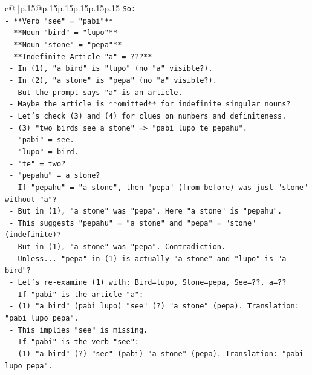 \documentclass{article}
\begin{document}
{\begin{supertabular}{c@{$\;$}|p{.15\linewidth}@{}p{.15\linewidth}p{.15\linewidth}p{.15\linewidth}p{.15\linewidth}p{.15\linewidth}}
{{{\texttt{So:} \\
\texttt{{-} **Verb "see" = "pabi"**} \\
\texttt{{-} **Noun "bird" = "lupo"**} \\
\texttt{{-} **Noun "stone" = "pepa"**} \\
\texttt{{-} **Indefinite Article "a" = ???**} \\
\texttt{  {-} In (1), "a bird" is "lupo" (no "a" visible?).} \\
\texttt{  {-} In (2), "a stone" is "pepa" (no "a" visible?).} \\
\texttt{  {-} But the prompt says "a" is an article.} \\
\texttt{  {-} Maybe the article is **omitted** for indefinite singular nouns?} \\
\texttt{  {-} Let's check (3) and (4) for clues on numbers and definiteness.} \\
\texttt{  {-} (3) "two birds see a stone" => "pabi lupo te pepahu".} \\
\texttt{    {-} "pabi" = see.} \\
\texttt{    {-} "lupo" = bird.} \\
\texttt{    {-} "te" = two?} \\
\texttt{    {-} "pepahu" = a stone?} \\
\texttt{    {-} If "pepahu" = "a stone", then "pepa" (from before) was just "stone" without "a"?} \\
\texttt{    {-} But in (1), "a stone" was "pepa". Here "a stone" is "pepahu".} \\
\texttt{    {-} This suggests "pepahu" = "a stone" and "pepa" = "stone" (indefinite)?} \\
\texttt{    {-} But in (1), "a stone" was "pepa". Contradiction.} \\
\texttt{    {-} Unless... "pepa" in (1) is actually "a stone" and "lupo" is "a bird"?} \\
\texttt{    {-} Let's re{-}examine (1) with: Bird=lupo, Stone=pepa, See=??, a=??} \\
\texttt{    {-} If "pabi" is the article "a":} \\
\texttt{      {-} (1) "a bird" (pabi lupo) "see" (?) "a stone" (pepa). Translation: "pabi lupo pepa".} \\
\texttt{      {-} This implies "see" is missing.} \\
\texttt{    {-} If "pabi" is the verb "see":} \\
\texttt{      {-} (1) "a bird" (?) "see" (pabi) "a stone" (pepa). Translation: "pabi lupo pepa".} \\
}}}
\end{supertabular}}
\end{document}
